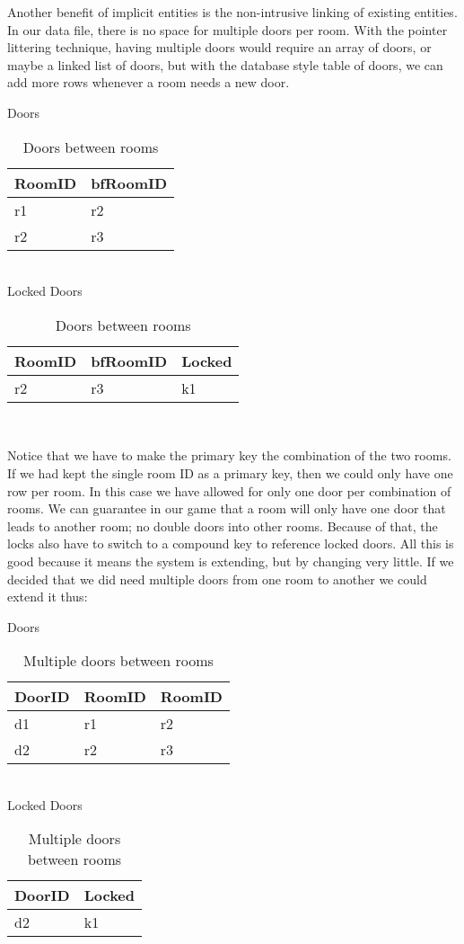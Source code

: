 Another benefit of implicit entities is the non-intrusive linking of existing
entities. In our data file, there is no space for multiple doors per room.
With the pointer littering technique, having multiple doors would require an
array of doors, or maybe a linked list of doors, but with the database style
table of doors, we can add more rows whenever a room needs a new door.

\begin{table}[h]\footnotesize
Doors \\
\begin{tabular}{ll}
\bf{RoomID}&bf{RoomID} \\
\hline
r1&r2 \\
r2&r3 \\
\end{tabular}\\
Locked Doors \\
\begin{tabular}{lll}
\bf{RoomID}&bf{RoomID}&Locked \\
\hline
r2&r3&k1 \\
\end{tabular}\\
\caption{Doors between rooms}
\end{table}

Notice that we have to make the primary key the combination of the two rooms.
If we had kept the single room ID as a primary key, then we could only have one
row per room. In this case we have allowed for only one door per combination of
rooms. We can guarantee in our game that a room will only have one door that
leads to another room; no double doors into other rooms. Because of that, the
locks also have to switch to a compound key to reference locked doors. All this
is good because it means the system is extending, but by changing very little.
If we decided that we did need multiple doors from one room to another we could
extend it thus:

\begin{table}[h]\footnotesize
Doors \\
\begin{tabular}{lll}
\bf{DoorID}&RoomID&RoomID \\
\hline
d1&r1&r2 \\
d2&r2&r3 \\
\end{tabular}\\
Locked Doors \\
\begin{tabular}{ll}
\bf{DoorID}&Locked \\
\hline
d2&k1 \\
\end{tabular}\\
\caption{Multiple doors between rooms}
\end{table}

